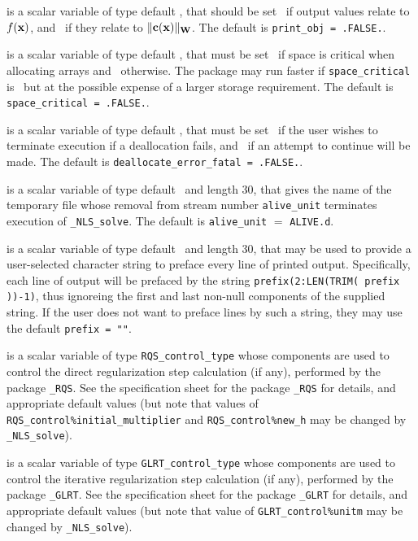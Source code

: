 \documentclass{galahad}
\newcommand{\packagename}{NLS}
\newcommand{\fullpackagename}{\libraryname\_\packagename}
\newcommand{\solver}{{\tt \fullpackagename\_solve}}
\begin{document}
\begin{description}
is a scalar variable of type default \logical,
that should be set \true\ if output values relate to $f({\mathbf{x}})$,
and \false\ if they relate to $\|{\mathbf{c}}({\mathbf{x}})\|_{{\mathbf{W}}}$.
The default is {\tt print\_obj = .FALSE.}.

 is a scalar variable of type default \logical,
that must be set \true\ if space is critical when allocating arrays
and  \false\ otherwise. The package may run faster if
{\tt space\_critical} is \false\ but at the possible expense of a larger
storage requirement. The default is {\tt space\_critical = .FALSE.}.

 is a scalar variable of type default \logical,
that must be set \true\ if the user wishes to terminate execution if
a deallocation  fails, and \false\ if an attempt to continue
will be made. The default is {\tt deallocate\_error\_fatal = .FALSE.}.

 is a scalar variable of type default \character\ and length
30, that gives the name of the temporary file whose removal from stream number
{\tt alive\_unit} terminates execution of \solver.
The default is {\tt alive\_unit} $=$ {\tt ALIVE.d}.

 is a scalar variable of type default \character\
and length 30, that may be used to provide a user-selected
character string to preface every line of printed output.
Specifically, each line of output will be prefaced by the string
{\tt prefix(2:LEN(TRIM( prefix ))-1)},
thus ignoreing the first and last non-null components of the
supplied string. If the user does not want to preface lines by such
a string, they may use the default {\tt prefix = ""}.

 is a scalar variable of type
{\tt RQS\_control\_type}
whose components are used to control the
direct regularization step calculation (if any),
performed by the package
{\tt \libraryname\_RQS}.
See the specification sheet for the package
{\tt \libraryname\_RQS}
for details, and appropriate default values
(but note that values of
{\tt RQS\_control\%init\-ial\_multiplier}
and
{\tt RQS\_control\%new\_h}
may be changed by \solver).

 is a scalar variable of type
{\tt GLRT\_control\_type}
whose components are used to control the
iterative regularization step calculation (if any),
performed by the package
{\tt \libraryname\_GLRT}.
See the specification sheet for the package
{\tt \libraryname\_GLRT}
for details, and appropriate default values
(but note that value of
{\tt GLRT\_control\%unitm}
may be changed by \solver).


\end{description}
\end{document}
